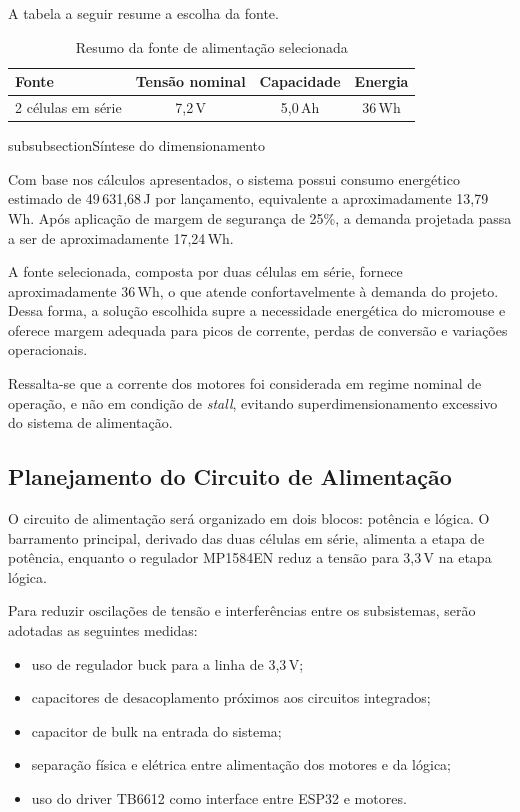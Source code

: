 A tabela a seguir resume a escolha da fonte.

\begin{table}[htbp]
    \centering
    \caption{Resumo da fonte de alimentação selecionada}
    \label{tab:fonte_alimentacao}

    \renewcommand{\arraystretch}{1.2}

    \begin{tabular}{lccc}
        \hline
        \textbf{Fonte} & \textbf{Tensão nominal} & \textbf{Capacidade} & \textbf{Energia} \\
        \hline
        2 células em série & 7,2\,V & 5,0\,Ah & 36\,Wh \\
        \hline
    \end{tabular}
\end{table}

subsubsection{Síntese do dimensionamento}

Com base nos cálculos apresentados, o sistema possui consumo energético estimado de 49\,631,68\,J por lançamento, equivalente a aproximadamente 13,79\,Wh. Após aplicação de margem de segurança de 25\%, a demanda projetada passa a ser de aproximadamente 17,24\,Wh.

A fonte selecionada, composta por duas células em série, fornece aproximadamente 36\,Wh, o que atende confortavelmente à demanda do projeto. Dessa forma, a solução escolhida supre a necessidade energética do micromouse e oferece margem adequada para picos de corrente, perdas de conversão e variações operacionais.

Ressalta-se que a corrente dos motores foi considerada em regime nominal de operação, e não em condição de \textit{stall}, evitando superdimensionamento excessivo do sistema de alimentação.

\subsection{Planejamento do Circuito de Alimentação}
\label{sec:planejamento_circuito_alimentacao}

O circuito de alimentação será organizado em dois blocos: potência e lógica. O barramento principal, derivado das duas células em série, alimenta a etapa de potência, enquanto o regulador MP1584EN reduz a tensão para 3,3\,V na etapa lógica.

Para reduzir oscilações de tensão e interferências entre os subsistemas, serão adotadas as seguintes medidas:
\begin{itemize}
    \item uso de regulador buck para a linha de 3,3\,V;
    \item capacitores de desacoplamento próximos aos circuitos integrados;
    \item capacitor de bulk na entrada do sistema;
    \item separação física e elétrica entre alimentação dos motores e da lógica;
    \item uso do driver TB6612 como interface entre ESP32 e motores.
\end{itemize}


